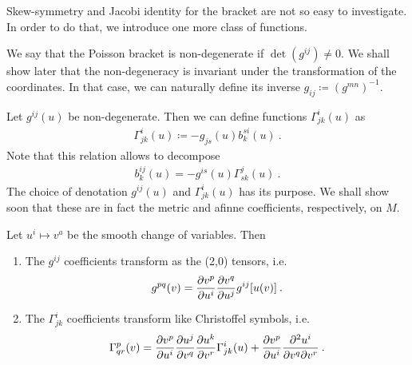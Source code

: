 Skew-symmetry and Jacobi identity for the bracket are not so easy to investigate. In order to do that, we introduce one more class of functions.

We say that the Poisson bracket is non-degenerate if $\det(g^{ij}) \neq 0$. We shall show later that the non-degeneracy is invariant under the transformation of the coordinates. In that case, we can naturally define its inverse $g_{ij} \coloneqq (g^{mn})^{-1}$.

Let $g^{ij}(u)$ be non-degenerate. Then we can define functions $\Gamma^{i}_{jk}(u)$ as
\begin{align}
    \Gamma^i_{jk}(u) \coloneqq - g_{js}(u) b^{s i}_k(u) \:. \label{eq:Gamma=g*b}
\end{align}
Note that this relation allows to decompose
\begin{align}
    b_k^{ij}(u) = -g^{is}(u) \Gamma^j_{sk}(u) \:. \label{eq:b=g*Gamma}
\end{align}
The choice of denotation $g^{ij}(u)$ and $\Gamma^{i}_{jk}(u)$ has its purpose. We shall show soon that these are in fact the metric and afinne coefficients, respectively, on $M$.


\begin{proposition} \label{prop:transoformace}
    Let $u^i \mapsto v^a$ be the smooth change of variables. Then
    \begin{enumerate}
        \item The $g^{ij}$ coefficients transform as the (2,0) tensors, i.e. 
        \begin{align}
            g^{pq}(v) = \frac{\partial v^p}{\partial u^i} \frac{\partial v^q}{\partial u^j} g^{ij}[u(v)] \:. \label{eq:transformace-metrika}
        \end{align}
        \item The $\Gamma^i_{jk}$ coefficients  transform like Christoffel symbols, i.e.
        \begin{align}
            \Gamma^p_{qr} (v) = \frac{\partial v^p}{\partial u^i} \frac{\partial u^j}{\partial v^q} \frac{\partial u^k}{\partial v^r} \Gamma^i_{jk}(u) + \frac{\partial v^p}{\partial u^i} \frac{\partial^2 u^i}{\partial v^q \partial v^r} \:. \label{eq:transformace-konexe}
        \end{align}
    \end{enumerate}
\end{proposition}

